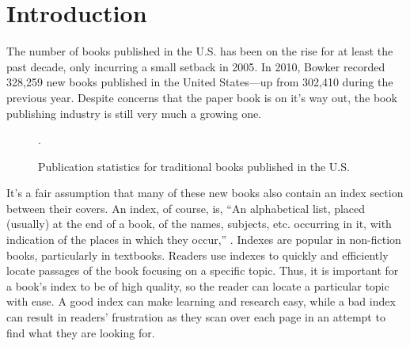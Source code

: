 \section{Introduction}

The number of books published in the U.S. has been on the rise for at least the past decade, only incurring a small setback in 2005\cite{bowker}.
In 2010, Bowker recorded 328,259 new books published in the United States---up from 302,410 during the previous year.
Despite concerns that the paper book is on it's way out, the book publishing industry is still very much a growing one.

\begin{center}
\begin{figure}
\label{fig:new-books}
\caption{Publication statistics for traditional books published in the U.S.\cite{bowker}}.
\end{figure}
\end{center}

It's a fair assumption that many of these new books also contain an index section between their covers.
An index, of course, is, ``An alphabetical list, placed (usually) at the end of a book, of the names, subjects, etc. occurring in it, with indication of the places in which they occur,'' \cite{oed-index}.
Indexes are popular in non-fiction books, particularly in textbooks.
Readers use indexes to quickly and efficiently locate passages of the book focusing on a specific topic.
Thus, it is important for a book's index to be of high quality, so the reader can locate a particular topic with ease.
A good index can make learning and research easy, while a bad index can result in readers' frustration as they scan over each page in an attempt to find what they are looking for.

